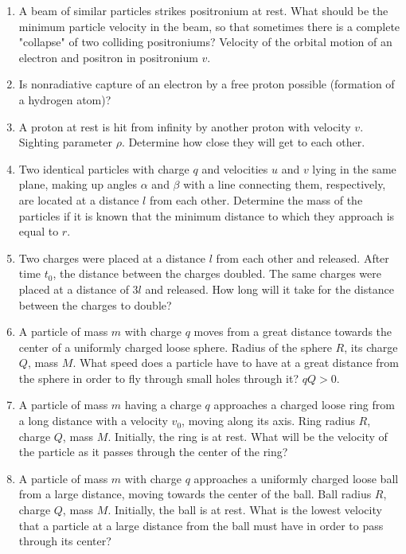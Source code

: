 \documentclass{article}
\begin{document}
\begin{enumerate}[label=7.4.\arabic*]
\item A beam of similar particles strikes positronium at rest. What should be the minimum particle velocity in the beam, so that sometimes there is a complete "collapse" of two colliding positroniums? Velocity of the orbital motion of an electron and positron in positronium $v$.

\item Is nonradiative capture of an electron by a free proton possible (formation of a hydrogen atom)?

\item A proton at rest is hit from infinity by another proton with velocity $v$. Sighting parameter $\rho$. Determine how close they will get to each other.

\item Two identical particles with charge $q$ and velocities $u$ and $v$ lying in the same plane, making up angles $\alpha$ and $\beta$ with a line connecting them, respectively, are located at a distance $l$ from each other. Determine the mass of the particles if it is known that the minimum distance to which they approach is equal to $r$.

\item Two charges were placed at a distance $l$ from each other and released. After time $t_0$, the distance between the charges doubled. The same charges were placed at a distance of $3l$ and released. How long will it take for the distance between the charges to double?

\item A particle of mass $m$ with charge $q$ moves from a great distance towards the center of a uniformly charged loose sphere. Radius of the sphere $R$, its charge $Q$, mass $M$. What speed does a particle have to have at a great distance from the sphere in order to fly through small holes through it? $qQ > 0$.

\item A particle of mass $m$ having a charge $q$ approaches a charged loose ring from a long distance with a velocity $v_0$, moving along its axis. Ring radius $R$, charge $Q$, mass $M$. Initially, the ring is at rest. What will be the velocity of the particle as it passes through the center of the ring?

\item A particle of mass $m$ with charge $q$ approaches a uniformly charged loose ball from a large distance, moving towards the center of the ball. Ball radius $R$, charge $Q$, mass $M$. Initially, the ball is at rest. What is the lowest velocity that a particle at a large distance from the ball must have in order to pass through its center?


\end{enumerate}
\end{document}
